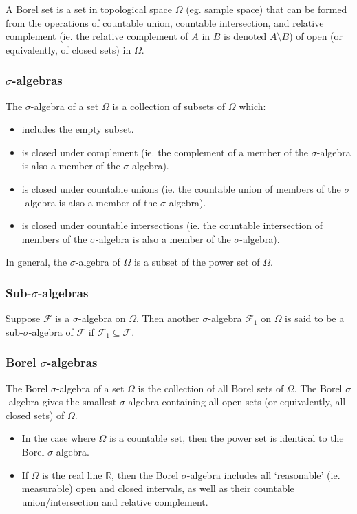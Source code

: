 \documentclass[11pt]{report} %
\begin{document}
A Borel set is a set in topological space $\Omega$ (eg. sample space) that can be formed from the operations of countable union, countable intersection, and relative complement (ie. the relative complement of $A$ in $B$ is denoted $A\setminus B$) of open (or equivalently, of closed sets) in $\Omega$.

\subsubsection{$\sigma$-algebras}

The $\sigma$-algebra of a set $\Omega$ is a collection of subsets of $\Omega$ which:
\begin{itemize}
\item includes the empty subset.
\item is closed under complement (ie. the complement of a member of the $\sigma$-algebra is also a member of the $\sigma$-algebra).
\item is closed under countable unions (ie. the countable union of members of the $\sigma$-algebra is also a member of the $\sigma$-algebra).
\item is closed under countable intersections (ie. the countable intersection of members of the $\sigma$-algebra is also a member of the $\sigma$-algebra).
\end{itemize}
In general, the $\sigma$-algebra of $\Omega$ is a subset of the power set of $\Omega$.

\subsubsection{Sub-$\sigma$-algebras}

Suppose $\mathcal{F}$ is a $\sigma$-algebra on $\Omega$. Then another $\sigma$-algebra $\mathcal{F}_{1}$ on $\Omega$ is said to be a sub-$\sigma$-algebra of $\mathcal{F}$ if $\mathcal{F}_{1} \subseteq \mathcal{F}$.

\subsubsection{Borel $\sigma$-algebras}

The Borel $\sigma$-algebra of a set $\Omega$ is the collection of all Borel sets of $\Omega$. The Borel $\sigma$-algebra gives the smallest $\sigma$-algebra containing all open sets (or equivalently, all closed sets) of $\Omega$.
\begin{itemize}
\item In the case where $\Omega$ is a countable set, then the power set is identical to the Borel $\sigma$-algebra.
\item If $\Omega$ is the real line $\mathbb{R}$, then the Borel $\sigma$-algebra includes all `reasonable' (ie. measurable) open and closed intervals, as well as their countable union/intersection and relative complement. 
\end{itemize}
\end{document}
